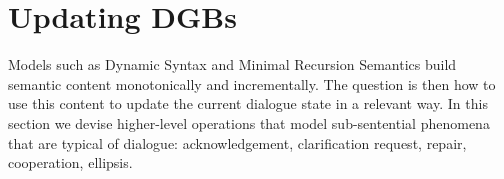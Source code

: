\documentclass[11pt]{article}
\begin{document}
				
				
				
			
				
	\section{Updating DGBs} \label{conversational_rules}
		Models such as Dynamic Syntax and Minimal Recursion Semantics build semantic content monotonically and incrementally. The question is then how to use this content to update the current dialogue state in a relevant way. In this section we devise higher-level operations that model sub-sentential phenomena that are typical of dialogue: acknowledgement, clarification request, repair, cooperation, ellipsis.
\end{document}
